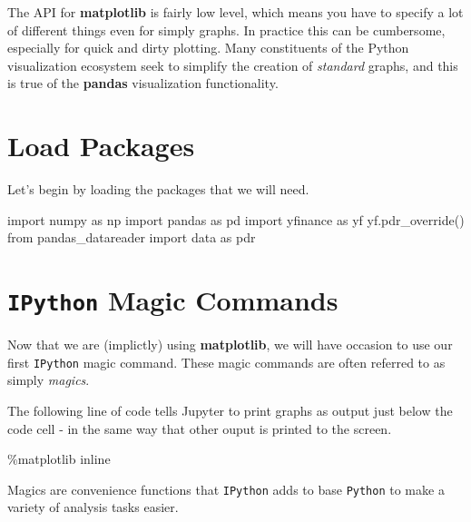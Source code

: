 \documentclass[
  letterpaper,
  DIV=11,
  numbers=noendperiod]{scrreprt}
\newenvironment{Shaded}{\begin{snugshade}}{\end{snugshade}}
\newcommand{\ImportTok}[1]{\textcolor[rgb]{0.00,0.46,0.62}{#1}}
\newcommand{\NormalTok}[1]{\textcolor[rgb]{0.00,0.23,0.31}{#1}}
\newcommand{\OperatorTok}[1]{\textcolor[rgb]{0.37,0.37,0.37}{#1}}
\begin{document}
The API for \textbf{matplotlib} is fairly low level, which means you
have to specify a lot of different things even for simply graphs. In
practice this can be cumbersome, especially for quick and dirty
plotting. Many constituents of the Python visualization ecosystem seek
to simplify the creation of \emph{standard} graphs, and this is true of
the \textbf{pandas} visualization functionality.

\hypertarget{load-packages}{%
\section{Load Packages}\label{load-packages}}

Let's begin by loading the packages that we will need.

\begin{Shaded}
\begin{Highlighting}[]
\ImportTok{import}\NormalTok{ numpy }\ImportTok{as}\NormalTok{ np}
\ImportTok{import}\NormalTok{ pandas }\ImportTok{as}\NormalTok{ pd}
\ImportTok{import}\NormalTok{ yfinance }\ImportTok{as}\NormalTok{ yf}
\NormalTok{yf.pdr\_override()}
\ImportTok{from}\NormalTok{ pandas\_datareader }\ImportTok{import}\NormalTok{ data }\ImportTok{as}\NormalTok{ pdr}
\end{Highlighting}
\end{Shaded}

\hypertarget{ipython-magic-commands}{%
\section{\texorpdfstring{\texttt{IPython} Magic
Commands}{IPython Magic Commands}}\label{ipython-magic-commands}}

Now that we are (implictly) using \textbf{matplotlib}, we will have
occasion to use our first \texttt{IPython} magic command. These magic
commands are often referred to as simply \emph{magics}.

The following line of code tells Jupyter to print graphs as output just
below the code cell - in the same way that other ouput is printed to the
screen.

\begin{Shaded}
\begin{Highlighting}[]
\OperatorTok{\%}\NormalTok{matplotlib inline}
\end{Highlighting}
\end{Shaded}

Magics are convenience functions that \texttt{IPython} adds to base
\texttt{Python} to make a variety of analysis tasks easier.
\end{document}
